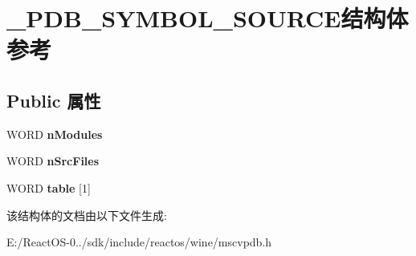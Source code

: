 \hypertarget{struct___p_d_b___s_y_m_b_o_l___s_o_u_r_c_e}{}\section{\+\_\+\+P\+D\+B\+\_\+\+S\+Y\+M\+B\+O\+L\+\_\+\+S\+O\+U\+R\+C\+E结构体 参考}
\label{struct___p_d_b___s_y_m_b_o_l___s_o_u_r_c_e}
\subsection*{Public 属性}
\begin{DoxyCompactItemize}
\item 
\mbox{\label{struct___p_d_b___s_y_m_b_o_l___s_o_u_r_c_e_ac23f303784d64a559e08e7ccf9679e13}} 
W\+O\+RD {\bfseries n\+Modules}
\item 
\mbox{\label{struct___p_d_b___s_y_m_b_o_l___s_o_u_r_c_e_adf09d0f5ec49313019435cb3443ce400}} 
W\+O\+RD {\bfseries n\+Src\+Files}
\item 
\mbox{\label{struct___p_d_b___s_y_m_b_o_l___s_o_u_r_c_e_a97a012fc4834721ba1d25004cd55c545}} 
W\+O\+RD {\bfseries table} \mbox{[}1\mbox{]}
\end{DoxyCompactItemize}


该结构体的文档由以下文件生成\+:\begin{DoxyCompactItemize}
\item 
E\+:/\+React\+O\+S-\/0../sdk/include/reactos/wine/mscvpdb.\+h\end{DoxyCompactItemize}
